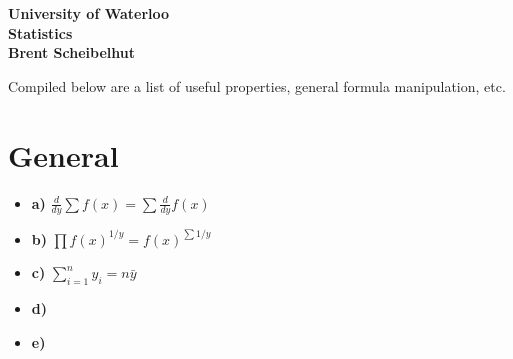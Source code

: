\documentclass[12pt]{article}
\begin{document}
\begin{center}
{\Large\bf University of Waterloo}\\
\vspace{3mm}
{\Large\bf Statistics}\\
\vspace{3mm}
\textbf{Brent Scheibelhut}
\end{center}

\def\question#1{\item[\bf #1.]}
\def\part#1{\item[\bf #1)]}
\newcommand{\pc}[1]{\mbox{\textbf{#1}}} %

Compiled below are a list of useful properties, general formula manipulation, etc.

\section{General}

\begin{minipage}[t]{8cm}
\begin{itemize}
\part{a} $\frac{d}{dy} \sum f(x) = \sum \frac{d}{dy} f(x)$
\part{b} $\prod f(x)^{1/y} = f(x)^{\sum 1/y}$
\part{c} $\sum\limits_{i=1}^{n}y_i = n\bar{y}$
\end{itemize}
\end{minipage}
\begin{minipage}[t]{8cm}
\begin{itemize}
\part{d} 
\part{e} 
\end{itemize}
\end{minipage}
\end{document}
